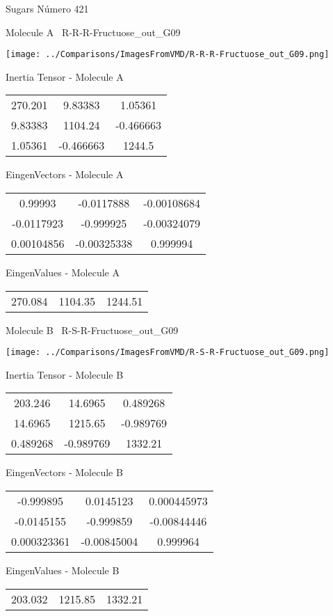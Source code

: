 \vtab[-3cm]
\begin{center}
{\large Sugars \tab Número 421}
\end{center}
\begin{multicols}{2}
\begin{center}

Molecule A \
R-R-R-Fructuose\_out\_G09

\texttt{[image: ../Comparisons/ImagesFromVMD/R-R-R-Fructuose\_out\_G09.png]}

Inertia Tensor - Molecule A \\
\begin{tabular}{|c c c|}
270.201	 & 	9.83383	 & 	1.05361	 \\
9.83383	 & 	1104.24	 & 	-0.466663	 \\
1.05361	 & 	-0.466663	 & 	1244.5
\end{tabular}

\vtab
 EingenVectors - Molecule A     \\
\begin{tabular}{|c c c|}
0.99993	 & 	-0.0117888	 & 	-0.00108684	 \\
-0.0117923	 & 	-0.999925	 & 	-0.00324079	 \\
0.00104856	 & 	-0.00325338	 & 	0.999994
\end{tabular}

\vtab
 EingenValues - Molecule A     \\
\begin{tabular}{|c c c|}
270.084	 & 	1104.35	 & 	1244.51	 \\
\end{tabular}
\columnbreak

Molecule B \
R-S-R-Fructuose\_out\_G09

\texttt{[image: ../Comparisons/ImagesFromVMD/R-S-R-Fructuose\_out\_G09.png]}

Inertia Tensor - Molecule B \\
\begin{tabular}{|c c c|}
203.246	 & 	14.6965	 & 	0.489268	 \\
14.6965	 & 	1215.65	 & 	-0.989769	 \\
0.489268	 & 	-0.989769	 & 	1332.21
\end{tabular}

\vtab
 EingenVectors - Molecule B     \\
\begin{tabular}{|c c c|}
-0.999895	 & 	0.0145123	 & 	0.000445973	 \\
-0.0145155	 & 	-0.999859	 & 	-0.00844446	 \\
0.000323361	 & 	-0.00845004	 & 	0.999964
\end{tabular}

\vtab
 EingenValues - Molecule B     \\
\begin{tabular}{|c c c|}
203.032	 & 	1215.85	 & 	1332.21	 \\
\end{tabular}

\end{center}
\end{multicols}

